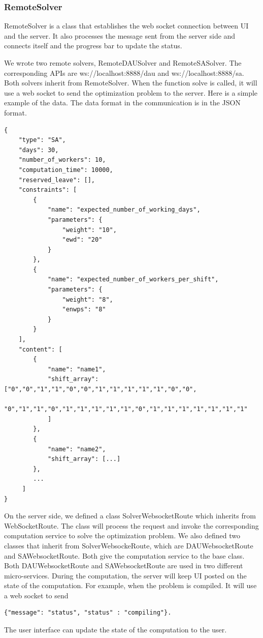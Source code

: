 \documentclass[11pt, oneside]{article}   	%
\begin{document}
\subsubsection{RemoteSolver}
RemoteSolver is a class that establishes the web socket connection between UI and the server. 
It also processes the message sent from the server side and connects itself and the progress bar to update the status.

We wrote two remote solvers, RemoteDAUSolver and RemoteSASolver. The corresponding APIs are ws://localhost:8888/dau and ws://localhost:8888/sa. Both solvers inherit from RemoteSolver.
When the function solve is called, it will use a web socket to send the optimization problem to the server. Here is a simple example of the data.
The data format in the communication is in the JSON format.
\begin{verbatim}
{
    "type": "SA",
    "days": 30,
    "number_of_workers": 10,
    "computation_time": 10000,
    "reserved_leave": [],
    "constraints": [
        {
            "name": "expected_number_of_working_days",
            "parameters": {
                "weight": "10",
                "ewd": "20"
            }
        },
        {
            "name": "expected_number_of_workers_per_shift",
            "parameters": {
                "weight": "8",
                "enwps": "8"
            }
        }
    ],
    "content": [
        {
            "name": "name1",
            "shift_array": ["0","0","1","1","0","0","1","1","1","1","1","0","0",
            "0","1","1","0","1","1","1","1","1","0","1","1","1","1","1","1","1"
            ]
        },
        {
            "name": "name2",
            "shift_array": [...]
        },
        ...
     ]
}

\end{verbatim}
On the server side, we defined a class SolverWebsocketRoute which inherits from WebSocketRoute. 
The class will process the request and invoke the corresponding computation service to solve the optimization problem.
We also defined two classes that inherit from SolverWebsockeRoute, which are DAUWebsocketRoute and SAWebsocketRoute.
Both give the computation service to the base class. Both DAUWebsocketRoute and SAWebsocketRoute are used in two different micro-services.
During the computation, the server will keep UI posted on the state of the computation. For example, when the problem is compiled. It will use a web socket to send
\begin{verbatim}
{"message": "status", "status" : "compiling"}.
\end{verbatim}
The user interface can update the state of the computation to the user.
\end{document}
